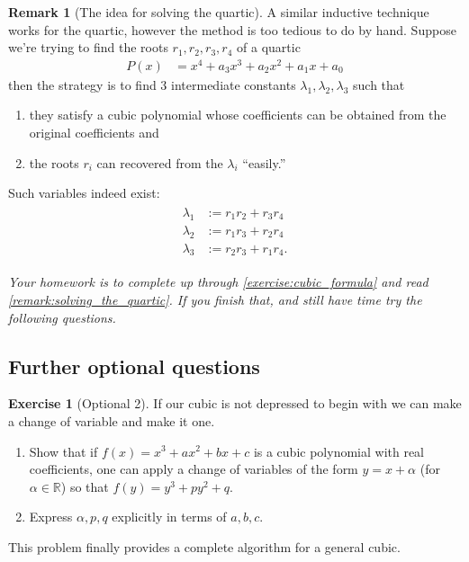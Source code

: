 \documentclass[reqno, 12pt, letter]{article}
\theoremstyle{plain}
\theoremstyle{definition}
\newtheorem{remark}[theorem]{Remark}
\newtheorem{exercise}[theorem]{Exercise}
\theoremstyle{remark}
\numberwithin{equation}{section}
\newcommand\br{{\mathbb R}}
\begin{document}
\begin{remark}[The idea for solving the quartic]
	\label{remark:solving_the_quartic}
	A similar inductive technique works for the quartic, however the method is too tedious to do by hand. Suppose we're trying to find the roots $ r_1, r_2, r_3, r_4$ of a quartic \begin{align*}
		P(x) & = x^4 + a_3x^3 + a_2x^2 + a_1x + a_0
	\end{align*}
	then the strategy is to find 3 {intermediate constants} $ \lambda_1, \lambda_2, \lambda_3$ such that
	\begin{enumerate}
		\item they satisfy a cubic polynomial whose coefficients can be obtained from the original coefficients and
		\item the roots $r_i$ can recovered from the $ \lambda_i$ ``easily.''		\end{enumerate}
	Such variables indeed exist:
	\begin{align}
		\label{equation:intermediate_variables_quartic}
		\begin{split}
			\lambda_1 &:= r_1 r_2 + r_3 r_4 \\
			\lambda_2 &:= r_1 r_3 + r_2 r_4 \\
			\lambda_3 &:= r_2 r_3 + r_1 r_4.
		\end{split}
	\end{align}

	{\it Your homework is to complete up through \autoref{exercise:cubic_formula} and read \autoref{remark:solving_the_quartic}. If you finish that, and still have time try the following questions.}
	\subsection{Further optional questions}

	\begin{exercise}[Optional 2]
		If our cubic is not depressed to begin with we can make a change of variable and make it one.
		\begin{enumerate}
			\item Show that if $f(x) = x^3 + ax^2 +bx +c$ is a cubic polynomial with real coefficients, one can apply a change of variables of the form $y = x + \alpha$ (for $\alpha \in \br$) so that $f(y) = y^3 + py^2 + q$.
			\item Express $\alpha, p, q$ explicitly in terms of $a,b,c$.
		\end{enumerate}
		This problem finally provides a complete algorithm for a general cubic.
	\end{exercise}


\end{remark}
\end{document}
